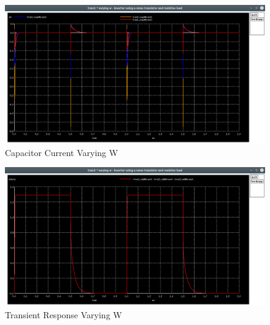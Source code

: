\documentclass[12pt]{article}
\begin{document}
	\begin{figure}[H]
		\begin{center}
			\includegraphics[scale=0.25]{images/inverter_w_vcap.png}
			\caption{Capacitor Current Varying W}
			\label{fig::varying_w_vcap}
		\end{center}
	\end{figure}
	
	\begin{figure}[H]
		\begin{center}
			\includegraphics[scale=0.25]{images/inverter_w_vdd.png}
			\caption{Transient Response Varying W}
			\label{fig::varying_w_vdd}
		\end{center}
	\end{figure}
	
\end{document}
